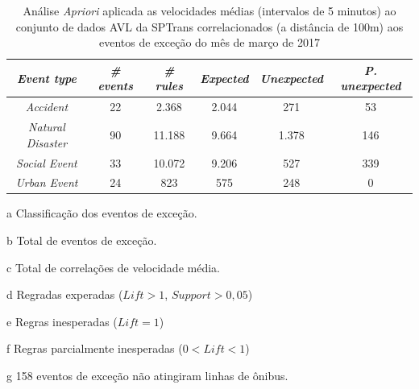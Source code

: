 \documentclass[
	12pt,				%
	oneside,			%
	a4paper,			%
	english,			%
	brazil				%
	]{abntex2ppgsi}
\begin{document}
{{\begin{apendicesenv}
\begin{table}[!htb]
\centering
\begin{threeparttable}
\caption {Análise \textit{Apriori} aplicada as velocidades médias (intervalos de 5 minutos) ao conjunto de dados AVL da SPTrans correlacionados (a distância de 100m) aos eventos de exceção do mês de março de 2017}
\label {tab:aprioriFull}
\begin{tabular}{c|c|c|c|c|c}
\hline
\textbf{\textit{Event type}}\tnote{a} & \textbf{\textit{\# events}}\tnote{b} & \textit{\textbf{\# rules}}\tnote{c} & \textbf{\textit{Expected}}\tnote{d} & \textbf{\textit{Unexpected}}\tnote{e} & \textbf{\textit{P. unexpected}}\tnote{f}   \\
\hline
\textit{Accident} & 22 & 2.368 & 2.044 & 271 & 53 \\
\textit{Natural Disaster} & 90 & 11.188 & 9.664 & 1.378 & 146 \\
\textit{Social Event} & 33 & 10.072 & 9.206 & 527 & 339 \\
\textit{Urban Event} & 24 & 823 & 575 & 248 & 0 \\
\hline
\end{tabular}
\begin{tablenotes}
            \item[a] Classificação dos eventos de exceção.
            \item[b] Total de eventos de exceção.
            \item[c] Total de correlações de velocidade média.
            \item[d] Regradas experadas ($Lift > 1$, $Support > 0,05$)
            \item[e] Regras inesperadas ($Lift = 1$)
            \item[f] Regras parcialmente inesperadas ($0 < Lift < 1$)
            \item[g] 158 eventos de exceção não atingiram linhas de ônibus.
        \end{tablenotes}
\end{threeparttable}
\end{table}



\end{apendicesenv}}}
\end{document}

